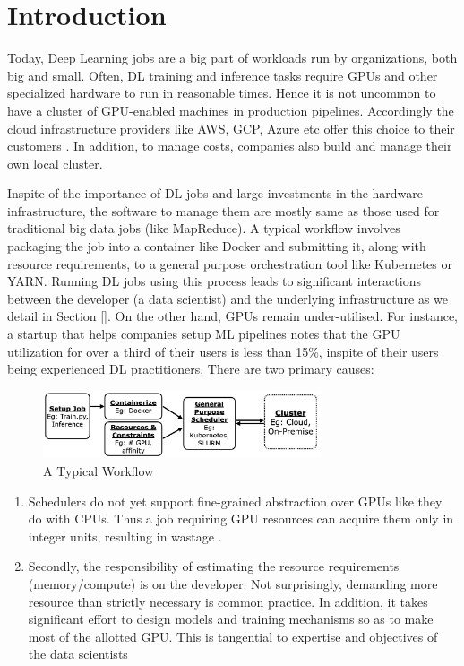 \section{Introduction}
\label{sec:introduction}

Today, Deep Learning jobs are a big part of workloads run by organizations, both
big and small. Often, DL training and inference tasks require GPUs and other
specialized hardware to run in reasonable times. Hence it is not uncommon to
have a cluster of GPU-enabled machines in production pipelines. Accordingly the
cloud infrastructure providers like AWS, GCP, Azure etc offer this choice to
their customers \cite{aws} \cite{GCP}. In addition, to manage costs, companies
also build and manage their own local cluster\cite{onprem}.


Inspite of the importance of DL jobs and large investments in the hardware
infrastructure, the software to manage them are mostly same as those used for
traditional big data jobs (like MapReduce). A typical workflow involves
packaging the job into a container like Docker and submitting it, along with
resource requirements, to a general purpose orchestration tool like Kubernetes
or YARN. Running DL jobs using this process leads to significant interactions
between the developer (a data scientist) and the underlying infrastructure as we
detail in Section []. On the other hand, GPUs remain under-utilised. For
instance, a startup that helps companies setup ML pipelines \cite{wab} notes
that the GPU utilization for over a third of their users is less than 15\%,
inspite of their users being experienced DL practitioners. There are two primary
causes:

\begin{figure}[htbp]
\centerline{\includegraphics[height=2cm]{figures/workflow.png}}
\caption{A Typical Workflow }
\label{fig}
\end{figure}



\begin{enumerate}

\item Schedulers do not yet support fine-grained abstraction over GPUs like they
do with CPUs. Thus a job requiring GPU resources can acquire them only in
integer units, resulting in wastage \cite{kub1}.

\item Secondly, the responsibility of estimating the resource requirements
(memory/compute) is on the developer. Not surprisingly, demanding more resource
than strictly necessary is common practice. In addition, it takes significant
effort to design models and training mechanisms so as to make most of the
allotted GPU. This is tangential to expertise and objectives of the data
scientists \cite{nimble}

\end{enumerate}

